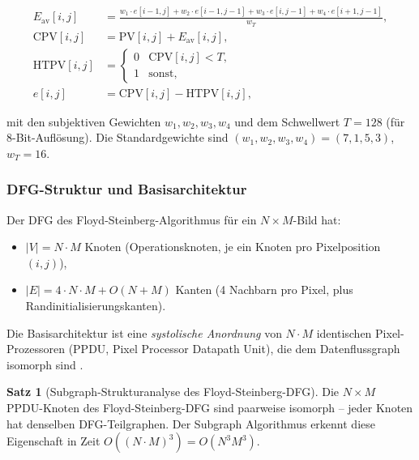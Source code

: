 ﻿\documentclass[a4paper,12pt]{article}
\theoremstyle{definition}
\newtheorem{satz}{Satz}
\begin{document}
\begin{align}
  E_{\text{av}}[i,j] &= \frac{w_1 \cdot e[i-1,j] + w_2 \cdot e[i-1,j-1]
                              + w_3 \cdot e[i,j-1] + w_4 \cdot e[i+1,j-1]}{w_T}, \\[4pt]
  \text{CPV}[i,j]    &= \text{PV}[i,j] + E_{\text{av}}[i,j], \\[4pt]
  \text{HTPV}[i,j]   &= \begin{cases} 0 & \text{CPV}[i,j] < T, \\ 1 & \text{sonst,} \end{cases}\\[4pt]
  e[i,j]             &= \text{CPV}[i,j] - \text{HTPV}[i,j],
\end{align}

mit den subjektiven Gewichten $w_1, w_2, w_3, w_4$ und dem Schwellwert $T = 128$
(für 8-Bit-Auflösung). Die Standardgewichte sind $(w_1, w_2, w_3, w_4) = (7, 1, 5, 3)$,
$w_T = 16$.

\subsubsection{DFG-Struktur und Basisarchitektur}

Der DFG des Floyd-Steinberg-Algorithmus für ein $N \times M$-Bild hat:
\begin{itemize}
  \item $|V| = N \cdot M$ Knoten (Operationsknoten, je ein Knoten pro Pixelposition $(i,j)$),
  \item $|E| = 4 \cdot N \cdot M + O(N + M)$ Kanten (4 Nachbarn pro Pixel, plus
        Randinitialisierungskanten).
\end{itemize}

Die Basisarchitektur ist eine \emph{systolische Anordnung} von $N \cdot M$ identischen
Pixel-Prozessoren (PPDU, Pixel Processor Datapath Unit), die dem Datenflussgraph
isomorph sind \cite[S.~554]{ciletti2011}.

\begin{satz}[Subgraph-Strukturanalyse des Floyd-Steinberg-DFG]\label{satz:fs_dfg}
  Die $N \times M$ PPDU-Knoten des Floyd-Steinberg-DFG sind paarweise isomorph --
  jeder Knoten hat denselben DFG-Teilgraphen. Der Subgraph Algorithmus erkennt diese
  Eigenschaft in Zeit $O((N \cdot M)^3) = O(N^3 M^3)$.
\end{satz}
\end{document}

